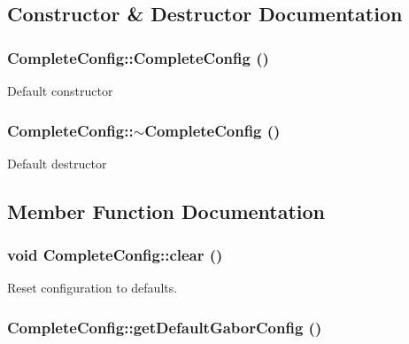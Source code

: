 \subsection{Constructor \& Destructor Documentation}
\hypertarget{classCompleteConfig_1daa896bdd73c37fc2c89481a5063459}{
\subsubsection[{CompleteConfig}]{\setlength{\rightskip}{0pt plus 5cm}CompleteConfig::CompleteConfig ()}}
\label{classCompleteConfig_1daa896bdd73c37fc2c89481a5063459}


Default constructor \hypertarget{classCompleteConfig_2130681d6d69b1df2d9e23605ced0831}{
\subsubsection[{$\sim$CompleteConfig}]{\setlength{\rightskip}{0pt plus 5cm}CompleteConfig::$\sim$CompleteConfig ()}}
\label{classCompleteConfig_2130681d6d69b1df2d9e23605ced0831}


Default destructor 

\subsection{Member Function Documentation}
\hypertarget{classCompleteConfig_4d8f89564b8f74ce0f84d90893197c69}{
\subsubsection[{clear}]{\setlength{\rightskip}{0pt plus 5cm}void CompleteConfig::clear ()}}
\label{classCompleteConfig_4d8f89564b8f74ce0f84d90893197c69}


Reset configuration to defaults. \hypertarget{classCompleteConfig_b8dda7195193e2c2639e74fafaf3bd8f}{
\subsubsection[{getDefaultGaborConfig}]{ CompleteConfig::getDefaultGaborConfig ()}}
\label{classCompleteConfig_b8dda7195193e2c2639e74fafaf3bd8f}


